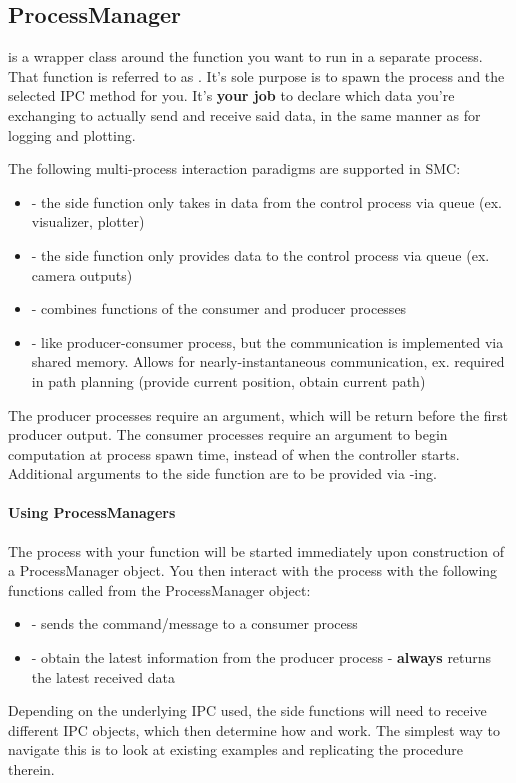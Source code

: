 \subsection{ProcessManager}
 is a wrapper class around the function
you want to run in a separate process.
That function is referred to as .
It's sole purpose is to spawn the process and the selected IPC method
for you. It's \textbf{your job} to declare which data you're exchanging
to actually send and receive said data, in the same manner as for logging
and plotting.

The following multi-process interaction paradigms are supported in SMC:
\begin{itemize}
\item {} - the side function only takes
	in data from the control process via queue (ex. visualizer, plotter)
\item {} - the side function only provides 
	data to the control process via queue (ex. camera outputs)
\item {} - combines
	functions of the consumer and producer processes
\item {} - like producer-consumer
	process, but the communication is implemented via shared memory.
	Allows for nearly-instantaneous communication,
	ex. required in path planning (provide current position,
	obtain current path)
\end{itemize}

The producer processes require an  argument,
which will be return before the first producer output.
The consumer processes require an 
argument to begin computation at process spawn time, instead
of when the controller starts.
Additional arguments to the side function are to be provided 
via -ing.

\paragraph{Using ProcessManagers}
The process with your function will be started 
immediately upon construction of a ProcessManager object. 
You then interact with the process with the following functions called
from the ProcessManager object:
\begin{itemize}
\item {} - sends the command/message
		to a consumer process 
\item {} - obtain the latest information
	from the producer process - \textbf{always}
		returns the latest received data
\end{itemize}
Depending on the underlying IPC used, the side functions will need
to receive different IPC objects, which then determine
how  and  work.
The simplest way to navigate this is to look at existing examples
and replicating the procedure therein.

